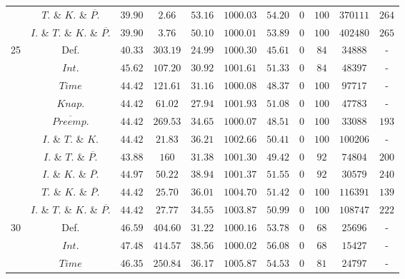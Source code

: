 \documentclass{article}
\begin{document}
\begin{table}[!htb]
{\begin{tabular}{|c|c|c|cc|cccccc|}
                             & $T.$ \& $K.$ \& $\overline{P.}$  &$39.90$ & $2.66$ & $53.16$ & $1000.03$ & $54.20$ & $0$ & $100$ & $370111$ & $264 $ \\ 
                             & $I.$ \& $T.$ \& $K.$ \& $\overline{P.}$  & $39.90$ & $3.76$ & $50.10$ & $1000.01$ & $53.89$ & $0$ & $100$ & $402480$ & $265 $ \\ 
    \hline
    \multirow{10}{*}{25} &  Def. &$40.33$ & $303.19$ & $24.99$ & $1000.30$ & $45.61$ & $0$ & $84$ & $34888$ & - \\ 
                             & $Int.$ & $45.62$ & $107.20$ & $30.92$ & $1001.61$ & $51.33$ & $0$ & $84$ & $48397$ & - \\ 
                             & $Time$  & $44.42$ & $121.61$ & $31.16$ & $1000.08$ & $48.37$ & $0$ & $100$ & $97717$ & - \\ 
                             & $Knap.$  & $44.42$ & $61.02$ & $27.94$ & $1001.93$ & $51.08$ & $0$ & $100$ & $47783$ & - \\ 
                             & $\overline{Preemp.}$&$44.42$ & $269.53$ & $34.65$ & $1000.07$ & $48.51$ & $0$ & $100$ & $33088$ & $193 $ \\ 
                             & $I.$ \& $T.$ \& $K.$ &$44.42$ & $21.83$ & $36.21$ & $1002.66$ & $50.41$ & $0$ & $100$ & $100206$ & - \\ 
                             & $I.$ \& $T.$ \& $\overline{P.}$  & $43.88$ & $160$ & $31.38$ & $1001.30$ & $49.42$ & $0$ & $92$ & $74804$ & $200 $ \\ 
                             & $I.$ \& $K.$ \& $\overline{P.}$  &$44.97$ & $50.22$ & $38.94$ & $1001.37$ & $51.55$ & $0$ & $92$ & $30579$ & $240 $ \\ 
                             & $T.$ \& $K.$ \& $\overline{P.}$  & $44.42$ & $25.70$ & $36.01$ & $1004.70$ & $51.42$ & $0$ & $100$ & $116391$ & $139 $ \\ 
                             & $I.$ \& $T.$ \& $K.$ \& $\overline{P.}$  & $44.42$ & $27.77$ & $34.55$ & $1003.87$ & $50.99$ & $0$ & $100$ & $108747$ & $222 $ \\ 
    \hline
    \multirow{10}{*}{30} &  Def. & $46.59$ & $404.60$ & $31.22$ & $1000.16$ & $53.78$ & $0$ & $68$ & $25696$ & - \\ 
                             & $Int.$ &$47.48$ & $414.57$ & $38.56$ & $1000.02$ & $56.08$ & $0$ & $68$ & $15427$ & - \\ 
                             & $Time$   &$46.35$ & $250.84$ & $36.17$ & $1005.87$ & $54.53$ & $0$ & $81$ & $24797$ & - \\ 

\end{tabular}}
\end{table}
\end{document}
